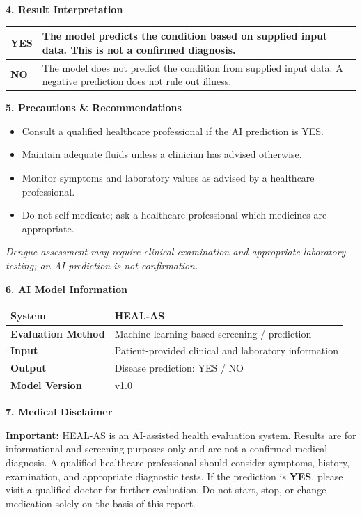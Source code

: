 \documentclass[11pt,a4paper]{article}
\newcommand{\sectiontitle}[1]{\vspace{8pt}\noindent\colorbox{HealBlue}{\parbox{\dimexpr\linewidth-2\fboxsep}{\color{white}\textbf{\large #1}}}\vspace{5pt}}
\begin{document}
\sectiontitle{4. Result Interpretation}
\begin{tabularx}{\linewidth}{|p{2cm}|X|}
\hline
\textbf{\color{HealRed}YES} & The model predicts the condition based on supplied input data. This is not a confirmed diagnosis.\\ \hline
\textbf{\color{HealGreen}NO} & The model does not predict the condition from supplied input data. A negative prediction does not rule out illness.\\ \hline
\end{tabularx}

\sectiontitle{5. Precautions \& Recommendations}
\begin{tcolorbox}[colback=white,colframe=HealRed]
\begin{itemize}[leftmargin=1.2cm]
\item Consult a qualified healthcare professional if the AI prediction is YES.
\item Maintain adequate fluids unless a clinician has advised otherwise.
\item Monitor symptoms and laboratory values as advised by a healthcare professional.
\item Do not self-medicate; ask a healthcare professional which medicines are appropriate.
\end{itemize}
\end{tcolorbox}

\textit{Dengue assessment may require clinical examination and appropriate laboratory testing; an AI prediction is not confirmation.}

\sectiontitle{6. AI Model Information}
\begin{tabularx}{\linewidth}{|l|X|}
\hline \textbf{System} & HEAL-AS \\ \hline
\textbf{Evaluation Method} & Machine-learning based screening / prediction \\ \hline
\textbf{Input} & Patient-provided clinical and laboratory information \\ \hline
\textbf{Output} & Disease prediction: YES / NO \\ \hline
\textbf{Model Version} & v1.0 \\ \hline
\end{tabularx}

\sectiontitle{7. Medical Disclaimer}
\begin{tcolorbox}[colback=HealLight,colframe=HealBlue]
\textbf{Important:} HEAL-AS is an AI-assisted health evaluation system. Results are for informational and screening purposes only and are not a confirmed medical diagnosis. A qualified healthcare professional should consider symptoms, history, examination, and appropriate diagnostic tests. If the prediction is \textbf{YES}, please visit a qualified doctor for further evaluation. Do not start, stop, or change medication solely on the basis of this report.
\end{tcolorbox}
\end{document}
